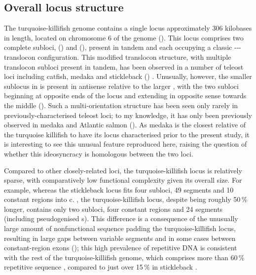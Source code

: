 \subsection{Overall locus structure}
\label{sec:nfu-locus-structure}
	
The turquoise-killifish genome contains a single \igh{} locus approximately 306 kilobases in length, located on chromosome 6 of the \Nfu genome (). This locus comprises two complete subloci,  () and  (), present in tandem and each occupying a classic {\vh-\dh-\jh-\ch} translocon configuration. This modified translocon structure, with multiple translocon subloci present in tandem, has been observed in a number of teleost \igh{} loci including catfish, medaka and stickleback () \parencite{fillatreau2013astonishing}. Unusually, however, the smaller  sublocus in \nfu \igh{} is present in antisense relative to the larger , with the two subloci beginning at opposite ends of the locus and extending in opposite sense towards the middle (). Such a multi-orientation structure has been seen only rarely in previously-characterised teleost \igh{} loci; to my knowledge, it has only been previously observed in medaka \parencite{magadan2011medaka} and Atlantic salmon (). As medaka is the closest relative of the turquoise killifish to have its locus characterised prior to the present study, it is interesting to see this unusual feature reproduced here, raising the question of whether this ideosyncracy is homologous between the two loci.
	
Compared to other closely-related loci, the turquoise-killifish locus is relatively sparse, with comparatively low functional complexity given its overall size. For example, whereas the stickleback locus fits four subloci, 49 \vh segments and 10 constant regions into c.  \parencite{bao2010stickleback,gambondeza2011stickleback}, the turquoise-killifish locus, despite being roughly 50\,\% longer, contains only two subloci, four constant regions and 24 \vh segments (including pseudogenised \vh{}s). This difference is a consequence of the unusually large amount of nonfunctional sequence padding the turquoise-killifish locus, resulting in large gaps between variable segments and in some cases between constant-region exons (); this high prevalence of repetitive DNA is consistent with the rest of the turquoise-killifish genome, which comprises more than 60\,\% repetitive sequence \parencite{willemsen2019popgen}, compared to just over 15\,\% in stickleback \parencite{yuan2018repeats}.
	
